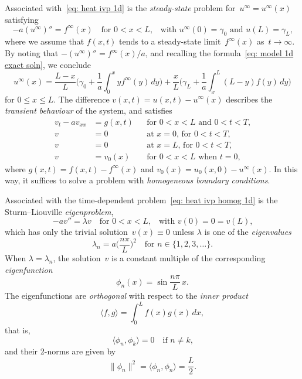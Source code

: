 Associated with~\eqref{eq: heat ivp 1d} is the \emph{steady-state} problem 
for~$u^\infty=u^\infty(x)$ satisfying
\[
-a(u^\infty)''=f^\infty(x)\quad\text{for $0<x<L$,}\quad
    \text{with $u^\infty(0)=\gamma_0$ and $u(L)=\gamma_L$,}
\]
where we assume that $f(x,t)$ tends to a steady-state 
limit~$f^\infty(x)$ as~$t\to\infty$.  By noting that 
$-(u^\infty)''=f^\infty(x)/a$, and recalling the 
formula~\eqref{eq: model 1d exact soln}, we conclude 
\[
u^\infty(x)=\frac{L-x}{L}\biggl(
    \gamma_0+\frac{1}{a}\int_0^x yf^\infty(y)\,dy\biggr)
    +\frac{x}{L}\biggl(\gamma_L+\frac{1}{a}\int_x^L(L-y)f(y)\,dy\biggr)
\]
for $0\le x\le L$.  The difference $v(x,t)=u(x,t)-u^\infty(x)$ describes the 
\emph{transient behaviour} of the system, and satisfies
\begin{equation}\label{eq: heat ivp homog 1d}
\begin{aligned}
v_t-av_{xx}&=g(x,t)&&\text{for $0<x<L$ and $0<t<T$,}\\
v&=0&&\text{at $x=0$, for $0<t<T$,}\\
v&=0&&\text{at $x=L$, for $0<t<T$,}\\
v&=v_0(x)&&\text{for $0<x<L$ when $t=0$,}
\end{aligned}
\end{equation}
where $g(x,t)=f(x,t)-f^\infty(x)$ and $v_0(x)=u_0(x,0)-u^\infty(x)$.  In this 
way, it suffices to solve a problem with \emph{homogeneous boundary conditions}.

Associated with the time-dependent problem~\eqref{eq: heat ivp homog 1d} is the 
Sturm--Liouville \emph{eigenproblem},
\[
-av''=\lambda v\quad\text{for $0<x<L$,}\quad\text{with $v(0)=0=v(L)$,}
\]
which has only the trivial solution~$v(x)\equiv0$ unless $\lambda$ is one of 
the \emph{eigenvalues} 
\[
\lambda_n=a\biggl(\frac{n\pi}{L}\biggr)^2\quad\text{for $n\in\{1,2,3,\ldots\}$.}
\]
When $\lambda=\lambda_n$, the solution~$v$ is a constant multiple of the 
corresponding \emph{eigenfunction}
\[
\phi_n(x)=\sin\frac{n\pi}{L}\,x.
\]
The eigenfunctions are \emph{orthogonal} with respect to the 
\emph{inner product}
\[
\langle f,g\rangle=\int_0^Lf(x)g(x)\,dx,
\]
that is,
\[
\langle\phi_n,\phi_k\rangle=0\quad\text{if $n\ne k$,}
\]
and their 2-norms are given by
\[
\|\phi_n\|^2=\langle\phi_n,\phi_n\rangle=\frac{L}{2}.
\]

